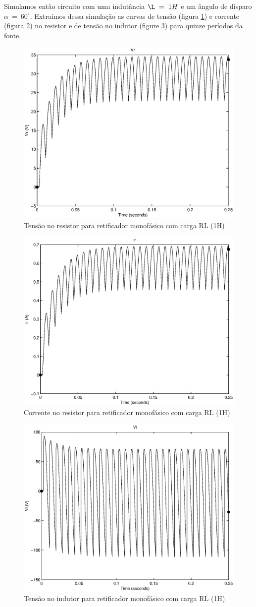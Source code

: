 \documentclass{report}
\begin{document}
Simulamos então circuito com uma indutância $\L\ =\ 1H$ e um ângulo de disparo $\alpha\ =\ 60^\circ$. Extraímos dessa simulação as curvas de tensão (figura \ref{fig:rl2vr}) e corrente (figura \ref{fig:rl2ir}) no resistor e de tensão no indutor (figure \ref{fig:rl2vl}) para quinze períodos da fonte.
\begin{figure}[H]
	\centering
	\includegraphics[width=0.7\linewidth]{matlab/rl2_vr}
	\caption{Tensão no resistor para retificador monofásico com carga RL (1H)}
	\label{fig:rl2vr}
\end{figure}
\begin{figure}[H]
	\centering
	\includegraphics[width=0.7\linewidth]{matlab/rl2_ir}
	\caption{Corrente no resistor para retificador monofásico com carga RL (1H)}
	\label{fig:rl2ir}
\end{figure}
\begin{figure}[H]
	\centering
	\includegraphics[width=0.7\linewidth]{matlab/rl2_vl}
	\caption{Tensão no indutor para retificador monofásico com carga RL (1H)}
	\label{fig:rl2vl}
\end{figure}
\end{document}
